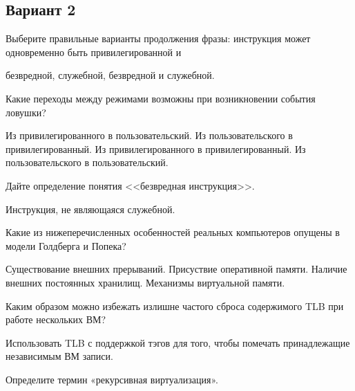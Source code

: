 \subsection*{Вариант 2}

\begin{questions}

\question[3] Выберите правильные варианты продолжения фразы: инструкция может одновременно быть привилегированной и
\begin{choices}
\choice безвредной,
\correctchoice служебной,
\choice безвредной и служебной.
\end{choices}

\question[3] Какие переходы между режимами возможны при возникновении события ловушки?
\begin{choices}
\choice        Из привилегированного в пользовательский.
\correctchoice Из пользовательского в привилегированный.
\correctchoice Из привилегированного в привилегированный.
\choice        Из пользовательского в пользовательский.
\end{choices}

\question[3] Дайте определение понятия <<безвредная инструкция>>.
\begin{solution}[1cm]
Инструкция, не являющаяся служебной.
\end{solution}

\question[3] Какие из нижеперечисленных особенностей реальных компьютеров опущены в модели Голдберга и Попека?
\begin{choices}
    \correctchoice Существование внешних прерываний.
    \choice Присуствие оперативной памяти.
    \correctchoice Наличие внешних постоянных хранилищ.
    \choice Механизмы виртуальной памяти.
\end{choices}

\question[3] Каким образом можно избежать излишне частого сброса содержимого TLB при работе нескольких ВМ?
\begin{solution}[1cm]
Использовать TLB с поддержкой тэгов для того, чтобы помечать принадлежащие независимым ВМ записи.
\end{solution}

\question[3] Определите термин «рекурсивная виртуализация». \todo
\begin{choices}
    \choice
    \correctchoice
\end{choices}


\end{questions}
